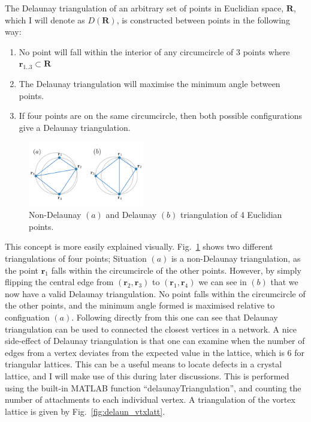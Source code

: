 The Delaunay triangulation of an arbitrary set of points in Euclidian space, $\mathbf{R}$, which I will denote as $D(\mathbf{R})$, is constructed between points in the following way:
\begin{enumerate}
    \item No point will fall within the interior of any circumcircle of 3 points where $\mathbf{r}_{1..3} \subset \mathbf{R}$
    \item The Delaunay triangulation will maximise the minimum angle between points.
    \item If four points are on the same circumcircle, then both possible configurations give a Delaunay triangulation.
\end{enumerate}

\begin{figure}\centering
    \includegraphics[width=0.45\textwidth]{Images/ch6_phasegineer/imgs/delaun}
    \caption{Non-Delaunay $(a)$ and Delaunay $(b)$ triangulation of 4 Euclidian points.}\label{fig:delaun}
\end{figure}
This concept is more easily explained visually. Fig.~\ref{fig:delaun} shows two different triangulations of four points; Situation $(a)$ is a non-Delaunay triangulation, as the point $\mathbf{r}_1$ falls within the circumcircle of the other points. However, by simply flipping the central edge from $(\mathbf{r}_2, \mathbf{r}_3)$ to $(\mathbf{r}_1, \mathbf{r}_4)$ we can see in $(b)$ that we now have a valid Delaunay triangulation. No point falls within the circumcircle of the other points, and the minimum angle formed is maximised relative to configuation $(a)$. Following directly from this one can see that Delaunay triangulation can be used to connected the closest vertices in a network. A nice side-effect of Delaunay triangulation is that one can examine when the number of edges from a vertex deviates from the expected value in the lattice, which is 6 for triangular lattices. This can be a useful means to locate defects in a crystal lattice, and I will make use of this during later discussions. This is performed using the built-in \textsc{MATLAB} function ``delaunayTriangulation'', and counting the number of attachments to each individual vertex. A triangulation of the vortex lattice is given by Fig.~\ref{fig:delaun_vtxlatt}.

